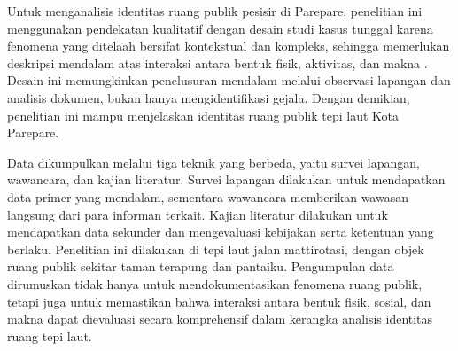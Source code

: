 \documentclass[11pt]{simart} %
\begin{document}
Untuk menganalisis identitas ruang publik pesisir di Parepare, penelitian ini menggunakan pendekatan kualitatif dengan desain studi kasus tunggal karena fenomena yang ditelaah bersifat kontekstual dan kompleks, sehingga memerlukan deskripsi mendalam atas interaksi antara bentuk fisik, aktivitas, dan makna \citep{creswell2016}.
Desain ini memungkinkan penelusuran mendalam melalui observasi lapangan dan analisis dokumen, bukan hanya mengidentifikasi gejala. Dengan demikian, penelitian ini mampu menjelaskan identitas ruang publik tepi laut Kota Parepare.

\begin{comment}
sehingga menghasilkan penjelasan yang kaya serta terikat konteks mengenai koridor tepi laut Mattirotasi \citep{creswell2016}.


Untuk menganalisis identitas ruang publik pesisir laut kota Parepare, penelitian ini menggunakan pendekatan kualitatif. Metode penelitian kualitatif memberikan pemahaman mendalam tentang suatu fenomena melalui observasi langsung dan analisis mendalam terhadap objek penelitian, yang sering kali dikenal sebagai pendekatan studi kasus tunggal \citep{creswell2016}. Pendekatan studi kasus penelitian ini mengumpulkan data fenomena terkait bentuk fisik, aktivitas, dan makna.
\end{comment}



Data dikumpulkan melalui tiga teknik yang berbeda, yaitu survei lapangan, wawancara, dan kajian literatur. Survei lapangan dilakukan untuk mendapatkan data primer yang mendalam, sementara wawancara memberikan wawasan langsung dari para informan terkait. Kajian literatur dilakukan untuk mendapatkan data sekunder dan mengevaluasi kebijakan serta ketentuan yang berlaku. Penelitian ini dilakukan di tepi laut jalan mattirotasi, dengan objek ruang publik sekitar taman terapung dan pantaiku.
Pengumpulan data dirumuskan tidak hanya untuk mendokumentasikan fenomena ruang publik, tetapi juga untuk memastikan bahwa interaksi antara bentuk fisik, sosial, dan makna dapat dievaluasi secara komprehensif dalam kerangka analisis identitas ruang tepi laut.
\end{document}
